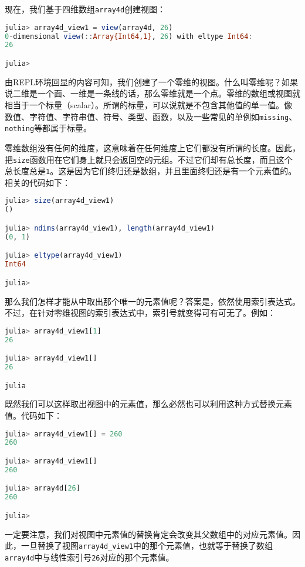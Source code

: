 现在，我们基于四维数组\verb|array4d|创建视图：

\begin{lstlisting}[language=julia]
julia> array4d_view1 = view(array4d, 26)
0-dimensional view(::Array{Int64,1}, 26) with eltype Int64:
26

julia> 
\end{lstlisting}

由REPL环境回显的内容可知，我们创建了一个零维的视图。什么叫零维呢？如果说二维是一个面、一维是一条线的话，那么零维就是一个点。零维的数组或视图就相当于一个标量（scalar）。所谓的标量，可以说就是不包含其他值的单一值。像数值、字符值、字符串值、符号、类型、函数，以及一些常见的单例如\verb|missing|、\verb|nothing|等都属于标量。

零维数组没有任何的维度，这意味着在任何维度上它们都没有所谓的长度。因此，把\verb|size|函数用在它们身上就只会返回空的元组。不过它们却有总长度，而且这个总长度总是\verb|1|。这是因为它们终归还是数组，并且里面终归还是有一个元素值的。相关的代码如下：

\begin{lstlisting}[language=julia]
julia> size(array4d_view1)
()

julia> ndims(array4d_view1), length(array4d_view1)
(0, 1)

julia> eltype(array4d_view1)
Int64

julia> 
\end{lstlisting}

那么我们怎样才能从中取出那个唯一的元素值呢？答案是，依然使用索引表达式。不过，在针对零维视图的索引表达式中，索引号就变得可有可无了。例如：

\begin{lstlisting}[language=julia]
julia> array4d_view1[1]
26

julia> array4d_view1[]
26

julia
\end{lstlisting}

既然我们可以这样取出视图中的元素值，那么必然也可以利用这种方式替换元素值。代码如下：

\begin{lstlisting}[language=julia]
julia> array4d_view1[] = 260
260

julia> array4d_view1[]
260

julia> array4d[26]
260

julia> 
\end{lstlisting}

一定要注意，我们对视图中元素值的替换肯定会改变其父数组中的对应元素值。因此，一旦替换了视图\verb|array4d_view1|中的那个元素值，也就等于替换了数组\verb|array4d|中与线性索引号\verb|26|对应的那个元素值。


